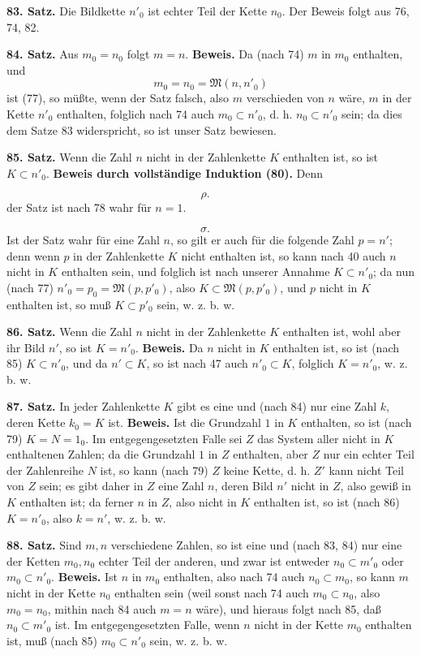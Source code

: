 \documentclass[11pt]{article}
\newcommand{\Mf}{\mathfrak{M}}
\newcommand{\partof}{\mathrel{\subset}}
\begin{document}
\noindent\textbf{83. Satz.} Die Bildkette $n'_0$ ist echter Teil der Kette $n_0$. Der Beweis folgt aus 76, 74, 82.

\noindent\textbf{84. Satz.} Aus $m_0=n_0$ folgt $m=n$. \textbf{Beweis.} Da (nach 74) $m$ in $m_0$ enthalten, und
\[
m_0=n_0=\Mf(n,n'_0)
\]
ist (77), so müßte, wenn der Satz falsch, also $m$ verschieden von $n$ wäre, $m$ in der Kette $n'_0$ enthalten, folglich nach 74 auch $m_0\partof n'_0$, d. h. $n_0\partof n'_0$ sein; da dies dem Satze 83 widerspricht, so ist unser Satz bewiesen.

\noindent\textbf{85. Satz.} Wenn die Zahl $n$ nicht in der Zahlenkette $K$ enthalten ist, so ist $K\partof n'_0$. \textbf{Beweis durch vollständige Induktion (80).} Denn

\[
\rho.\quad
\]
der Satz ist nach 78 wahr für $n=1$.

\[
\sigma.\quad
\]
Ist der Satz wahr für eine Zahl $n$, so gilt er auch für die folgende Zahl $p=n'$; denn wenn $p$ in der Zahlenkette $K$ nicht enthalten ist, so kann nach 40 auch $n$ nicht in $K$ enthalten sein, und folglich ist nach unserer Annahme $K\partof n'_0$; da nun (nach 77) $n'_0=p_0=\Mf(p,p'_0)$, also $K\partof\Mf(p,p'_0)$, und $p$ nicht in $K$ enthalten ist, so muß $K\partof p'_0$ sein, w. z. b. w.

\noindent\textbf{86. Satz.} Wenn die Zahl $n$ nicht in der Zahlenkette $K$ enthalten ist, wohl aber ihr Bild $n'$, so ist $K=n'_0$. \textbf{Beweis.} Da $n$ nicht in $K$ enthalten ist, so ist (nach 85) $K\partof n'_0$, und da $n'\partof K$, so ist nach 47 auch $n'_0\partof K$, folglich $K=n'_0$, w. z. b. w.

\noindent\textbf{87. Satz.} In jeder Zahlenkette $K$ gibt es eine und (nach 84) nur eine Zahl $k$, deren Kette $k_0=K$ ist. \textbf{Beweis.} Ist die Grundzahl $1$ in $K$ enthalten, so ist (nach 79) $K=N=1_0$. Im entgegengesetzten Falle sei $Z$ das System aller nicht in $K$ enthaltenen Zahlen; da die Grundzahl $1$ in $Z$ enthalten, aber $Z$ nur ein echter Teil der Zahlenreihe $N$ ist, so kann (nach 79) $Z$ keine Kette, d. h. $Z'$ kann nicht Teil von $Z$ sein; es gibt daher in $Z$ eine Zahl $n$, deren Bild $n'$ nicht in $Z$, also gewiß in $K$ enthalten ist; da ferner $n$ in $Z$, also nicht in $K$ enthalten ist, so ist (nach 86) $K=n'_0$, also $k=n'$, w. z. b. w.

\noindent\textbf{88. Satz.} Sind $m,n$ verschiedene Zahlen, so ist eine und (nach 83, 84) nur eine der Ketten $m_0,n_0$ echter Teil der anderen, und zwar ist entweder $n_0\partof m'_0$ oder $m_0\partof n'_0$. \textbf{Beweis.} Ist $n$ in $m_0$ enthalten, also nach 74 auch $n_0\partof m_0$, so kann $m$ nicht in der Kette $n_0$ enthalten sein (weil sonst nach 74 auch $m_0\partof n_0$, also $m_0=n_0$, mithin nach 84 auch $m=n$ wäre), und hieraus folgt nach 85, daß $n_0\partof m'_0$ ist. Im entgegengesetzten Falle, wenn $n$ nicht in der Kette $m_0$ enthalten ist, muß (nach 85) $m_0\partof n'_0$ sein, w. z. b. w.
\end{document}
